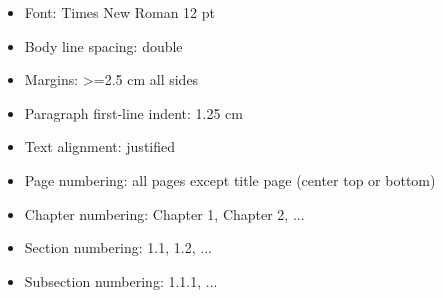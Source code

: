 \begin{itemize}
  \item Font: Times New Roman 12 pt
  \item Body line spacing: double
  \item Margins: >=2.5 cm all sides
  \item Paragraph first-line indent: 1.25 cm
  \item Text alignment: justified
  \item Page numbering: all pages except title page (center top or bottom)
  \item Chapter numbering: Chapter 1, Chapter 2, ...
  \item Section numbering: 1.1, 1.2, ...
  \item Subsection numbering: 1.1.1, ...
\end{itemize}

